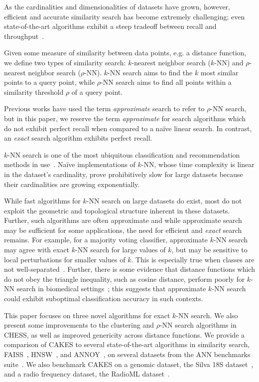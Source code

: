 As the cardinalities and dimensionalities of datasets have grown, however, efficient and accurate similarity search has become extremely challenging; 
even state-of-the-art algorithms exhibit a steep tradeoff between recall and throughput~\cite{Malkov2016EfficientAR, johnson2019billion, annoy, aumuller2020ann}.

Given some measure of similarity between data points, e.g. a distance function, we define two types of similarity search: $k$-nearest neighbor search ($k$-NN) and $\rho$-nearest neighbor search ($\rho$-NN).
$k$-NN search aims to find the $k$ most similar points to a query point, while $\rho$-NN search aims to find all points within a similarity threshold $\rho$ of a query point.

Previous works have used the term \emph{approximate} search to refer to $\rho$-NN search, but in this paper, we reserve the term \emph{approximate} for search algorithms which do not exhibit perfect recall when compared to a na\"{i}ve linear search.
In contrast, an \emph{exact} search algorithm exhibits perfect recall.

$k$-NN search is one of the most ubiquitous classification and recommendation methods in use~\cite{fix1952discriminatory, cover1967nearest}.
Na\"{i}ve implementations of $k$-NN, whose time complexity is linear in the dataset's cardinality, prove prohibitively slow for large datasets because their cardinalities are growing exponentially.

While fast algorithms for $k$-NN search on large datasets do exist, most do not exploit the geometric and topological structure inherent in these datasets.
Further, such algorithms are often approximate and while approximate search may be sufficient for some applications, the need for efficient and \emph{exact} search remains.
For example, for a majority voting classifier, approximate $k$-NN search may agree with exact $k$-NN search for large values of $k$, but may be sensitive to local perturbations for smaller values of $k$.
This is especially true when classes are not well-separated~\cite{zhang2022imbalanced}.
Further, there is some evidence that distance functions which do not obey the triangle inequality, such as cosine distance, perform poorly for $k$-NN search in biomedical settings~\cite{hu2016distance};
this suggests that approximate $k$-NN search could exhibit suboptimal classification accuracy in such contexts.

This paper focuses on three novel algorithms for exact $k$-NN search.
We also present some improvements to the clustering and $\rho$-NN search algorithms in CHESS, as well as improved genericity across distance functions.
We provide a comparison of CAKES to several state-of-the-art algorithms in similarity search, FAISS~\cite{johnson2019billion}, HNSW~\cite{malkov2016hnsw}, and ANNOY~\cite{annoy}, on several datasets from the ANN benchmarks suite~\cite{aumuller2020ann}.
We also benchmark CAKES on a genomic dataset, the Silva 18S dataset~\cite{10.1093/nar/gks1219}, and a radio frequency dataset, the RadioML dataset~\cite{oshea2018radioml}.


